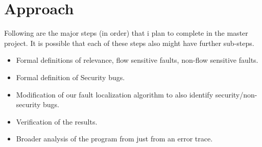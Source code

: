 \documentclass{article}
\begin{document}
\section{Approach}
Following are the major steps (in order) that i plan to complete in the master project. It is possible that each of these steps also might have further sub-steps.\\
\begin{itemize}
\item Formal definitions of relevance, flow sensitive faults, non-flow sensitive faults.
\item Formal definition of Security bugs.
\item Modification of our fault localization algorithm to also identify security/non-security bugs.
\item Verification of the results.
\item Broader analysis of the program from just from an error trace.
\end{itemize}
\end{document}
